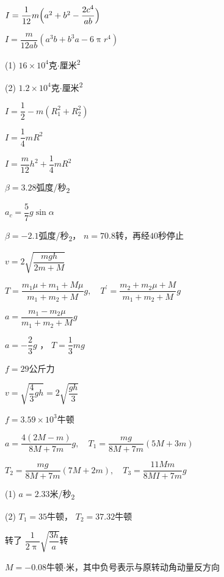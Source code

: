 \achapter

\addtocounter{answer}{4}

\answer $ I = \dfrac { 1 } { 1 2 } m \Bigl( a ^ 2 + b ^ { 2 } - \dfrac { 2 c ^ { 4 } } { a b } \Bigr) $

\answer $ I = \dfrac { m } { 1 2 a b } \left( a ^ { 3 } b + b ^ { 3 } a - 6 \uppi r ^ { 4 } \right)  $

\answer (1) $ 1 6 \times 1 0 ^ { 4 }   $克$ \cdot $厘米\textsuperscript{2}

(2) $  1 . 2 \times 1 0 ^ { 4 }   $克$ \cdot $厘米\textsuperscript{2}

\answer $ I = \dfrac { 1 } { 2 } - m \left( R _ { 1 } ^ { 2 } + R _ { 2 } ^ 2 \right) $

\answer $ I = \dfrac { 1 } { 4 } m R ^ { 2 }  $

\answer $ I = \dfrac { m } { 12 } h ^ { 2 } + \dfrac { 1 } { 4 } m R ^ { 2 }  $

\answer $ \beta = 3 . 2 8   $弧度/秒\textsubscript{2}

\answer $ a _ { c } = \dfrac { 5 } { 7 } g \sin \alpha $

\answer $ \beta = - 2 .  1 $弧度/秒\textsubscript{2}， $ n = 7 0 . 8   $转，再经$ 40 $秒停止

\answer $ v = 2 \sqrt { \dfrac { m g h } { 2m + M } }   $

\answer $T=\dfrac{m_{1} \mu+m_{1}+M \mu}{m_{1}+m_{2}+M} g, \quad T^{\prime}=\dfrac{m_{2}+m_{2} \mu+M}{m_{1}+m_{2}+M} g$

$a=\dfrac{m_{1}-m_{2} \mu}{m_{1}+m_{2}+M} g$

\answer $ a = - \dfrac { 2 } { 3 } g $ ， $ T = \dfrac { 1 } { 3 } m g $

\answer $ f = 2 9   $公斤力

\answer $v=\sqrt{\dfrac{4}{3} g h}=2 \sqrt{\dfrac{g h}{3}}$

\answer $ f = 3 . 5 9 \times 1 0 ^ { 3 }   $牛顿

\answer $a=\dfrac{4(2 M-m)}{8 M+7 m} g, \quad T_{1}=\dfrac{m g}{8 M+7 m}(5M+3 m)$

$T_{2}=\dfrac{m g}{8 M+7 m}(7 M+2 m), \quad T_{3}=\dfrac{11 M m}{8 M I+7 m} g$

\answer (1) $ a = 2 . 3 3   $米/秒\textsubscript{2}

(2) $ T_ { 1 } = 3 5 $牛顿， $ T _ { 2 } = 3 7 . 3 2   $牛顿

\answer 转了 $ \dfrac { 1 } { 2 \uppi } \sqrt { \dfrac { 3 h } { a } }  $转

\answer $ M = - 0 . 0 8  $牛顿$ \cdot $米，其中负号表示与原转动角动量反方向

